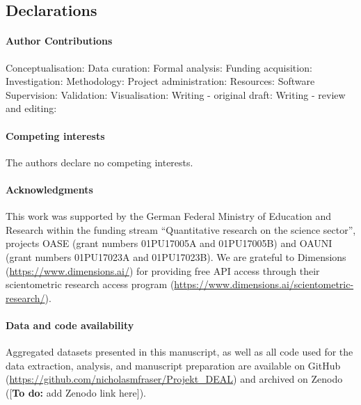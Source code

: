 \documentclass[
]{article}
\begin{document}
\hypertarget{declarations}{%
\subsection{Declarations}\label{declarations}}

\hypertarget{author-contributions}{%
\paragraph{Author Contributions}\label{author-contributions}}

Conceptualisation:
Data curation:
Formal analysis:
Funding acquisition:
Investigation:
Methodology:
Project administration:
Resources:
Software
Supervision:
Validation:
Visualisation:
Writing - original draft:
Writing - review and editing:

\hypertarget{competing-interests}{%
\paragraph{Competing interests}\label{competing-interests}}

The authors declare no competing interests.

\hypertarget{acknowledgments}{%
\paragraph{Acknowledgments}\label{acknowledgments}}

This work was supported by the German Federal Ministry of Education and Research within the
funding stream ``Quantitative research on the science sector'', projects OASE (grant numbers 01PU17005A and 01PU17005B) and OAUNI (grant numbers 01PU17023A and 01PU17023B). We are grateful to Dimensions (\url{https://www.dimensions.ai/}) for providing free API access through their scientometric research access program (\url{https://www.dimensions.ai/scientometric-research/}).

\hypertarget{data-and-code-availability}{%
\paragraph{Data and code availability}\label{data-and-code-availability}}

Aggregated datasets presented in this manuscript, as well as all code used for the data extraction, analysis, and manuscript preparation are available on GitHub (\url{https://github.com/nicholasmfraser/Projekt_DEAL}) and archived on Zenodo ({[}\textbf{To do:} add Zenodo link here{]}).
\end{document}
